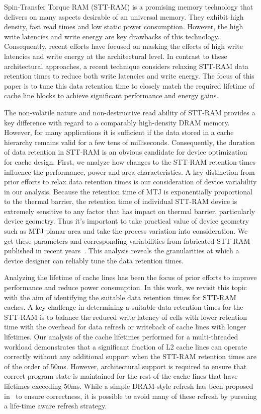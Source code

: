 
Spin-Transfer Torque RAM (STT-RAM) is a promising memory technology that
delivers on many aspects desirable of an universal memory. They exhibit
high density, fast read times and low static power consumption. However,
the high write latencies and write energy are key drawbacks of this
technology. Consequently, recent efforts have focused on masking the
effects of high write latencies and write energy at the architectural level.
In contrast to these architectural approaches, a recent technique
considers relaxing STT-RAM data retention times to reduce both write
latencies and
write energy. The focus of this paper is  to tune this data retention
time to closely match the required lifetime of cache line blocks to
achieve significant
performance and energy gains.

The non-volatile nature and non-destructive read ability of  STT-RAM
provides a key difference with regard to a comparably high-density DRAM
memory. However, for many applications it is sufficient if the data
stored in a cache hierarchy remains valid for a few tens of
milliseconds. Consequently, the duration of data retention in STT-RAM is
an obvious candidate for device optimization for cache design. First,
we  analyze how changes to the STT-RAM retention times influence the
performance, power and area characteristics. A key distinction from
prior efforts to relax data retention times is our consideration of
device variability in our analysis. Because the retention time of MTJ is exponentially proportional to the thermal barrier, the retention time of individual STT-RAM device is extremely sensitive to any factor that has impact on thermal barrier, particularly device geometry. Thus it's important to take practical value of device geometry such as MTJ planar area and take the process variation into consideration. We get these parameters and corresponding variabilities from fabricated STT-RAM published in recent years~\cite{PMTJ:Toshiba08;STTRAM:EDL11;STTRAM:Qualcomm09;STTRAM:Grandis11}. This analysis reveals the granularities at which a device designer can reliably tune the data retention times.


Analyzing the lifetime of cache lines has been the focus of prior
efforts to improve performance and reduce power consumption. In this
work, we
revisit this topic with the aim of identifying the suitable data
retention times for STT-RAM caches. A key challenge in determining a
suitable
data retention times for the STT-RAM is to balance the reduced write
latency of cells with lower retention time with the overhead for data
refresh or
writeback of cache lines with longer lifetimes. Our analysis of the
cache lifetimes performed for a multi-threaded workload demonstrates
that a significant fraction of L2 cache lines can operate correctly
without any additional support when the STT-RAM retention times are of
the order of 50ms. However, architectural support is required to ensure
that correct program state is maintained for the rest of the cache lines
that have lifetimes exceeding 50ms. While a simple
DRAM-style refresh has been proposed in~\cite{STTRAM:HPCA11} to ensure
correctness, it is possible to avoid many of these refresh by pursuing a
life-time aware refresh strategy.

